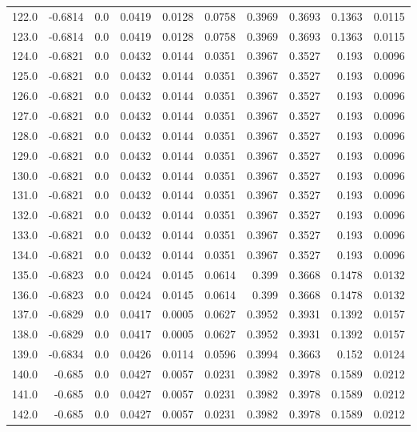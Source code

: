 \begin{longtable}{lrrrrrrrrr}
122.0 & -0.6814 & 0.0 & 0.0419 & 0.0128 & 0.0758 & 0.3969 & 0.3693 & 0.1363 & 0.0115 \\
123.0 & -0.6814 & 0.0 & 0.0419 & 0.0128 & 0.0758 & 0.3969 & 0.3693 & 0.1363 & 0.0115 \\
124.0 & -0.6821 & 0.0 & 0.0432 & 0.0144 & 0.0351 & 0.3967 & 0.3527 & 0.193 & 0.0096 \\
125.0 & -0.6821 & 0.0 & 0.0432 & 0.0144 & 0.0351 & 0.3967 & 0.3527 & 0.193 & 0.0096 \\
126.0 & -0.6821 & 0.0 & 0.0432 & 0.0144 & 0.0351 & 0.3967 & 0.3527 & 0.193 & 0.0096 \\
127.0 & -0.6821 & 0.0 & 0.0432 & 0.0144 & 0.0351 & 0.3967 & 0.3527 & 0.193 & 0.0096 \\
128.0 & -0.6821 & 0.0 & 0.0432 & 0.0144 & 0.0351 & 0.3967 & 0.3527 & 0.193 & 0.0096 \\
129.0 & -0.6821 & 0.0 & 0.0432 & 0.0144 & 0.0351 & 0.3967 & 0.3527 & 0.193 & 0.0096 \\
130.0 & -0.6821 & 0.0 & 0.0432 & 0.0144 & 0.0351 & 0.3967 & 0.3527 & 0.193 & 0.0096 \\
131.0 & -0.6821 & 0.0 & 0.0432 & 0.0144 & 0.0351 & 0.3967 & 0.3527 & 0.193 & 0.0096 \\
132.0 & -0.6821 & 0.0 & 0.0432 & 0.0144 & 0.0351 & 0.3967 & 0.3527 & 0.193 & 0.0096 \\
133.0 & -0.6821 & 0.0 & 0.0432 & 0.0144 & 0.0351 & 0.3967 & 0.3527 & 0.193 & 0.0096 \\
134.0 & -0.6821 & 0.0 & 0.0432 & 0.0144 & 0.0351 & 0.3967 & 0.3527 & 0.193 & 0.0096 \\
135.0 & -0.6823 & 0.0 & 0.0424 & 0.0145 & 0.0614 & 0.399 & 0.3668 & 0.1478 & 0.0132 \\
136.0 & -0.6823 & 0.0 & 0.0424 & 0.0145 & 0.0614 & 0.399 & 0.3668 & 0.1478 & 0.0132 \\
137.0 & -0.6829 & 0.0 & 0.0417 & 0.0005 & 0.0627 & 0.3952 & 0.3931 & 0.1392 & 0.0157 \\
138.0 & -0.6829 & 0.0 & 0.0417 & 0.0005 & 0.0627 & 0.3952 & 0.3931 & 0.1392 & 0.0157 \\
139.0 & -0.6834 & 0.0 & 0.0426 & 0.0114 & 0.0596 & 0.3994 & 0.3663 & 0.152 & 0.0124 \\
140.0 & -0.685 & 0.0 & 0.0427 & 0.0057 & 0.0231 & 0.3982 & 0.3978 & 0.1589 & 0.0212 \\
141.0 & -0.685 & 0.0 & 0.0427 & 0.0057 & 0.0231 & 0.3982 & 0.3978 & 0.1589 & 0.0212 \\
142.0 & -0.685 & 0.0 & 0.0427 & 0.0057 & 0.0231 & 0.3982 & 0.3978 & 0.1589 & 0.0212 \\

\end{longtable}
